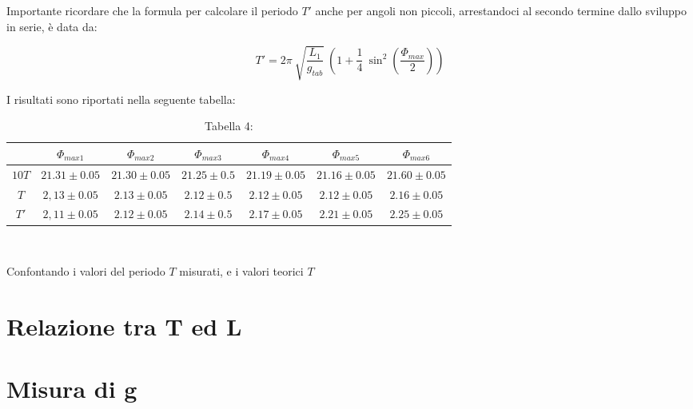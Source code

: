 \documentclass[12pt, a4paper]{article}
\begin{document}
Importante ricordare che la formula per calcolare il periodo $T'$ anche per angoli non piccoli, arrestandoci al secondo termine dallo sviluppo in serie, è data da:

\begin{equation*}
    T'=2\pi\ \sqrt{\frac{L_1}{g_{tab}}}\ \left(1+\frac{1}{4}\ \sin^2{\left(\frac{\Phi_{max}}{2}\right)}\right)
\end{equation*}

\bigskip

I risultati sono riportati nella seguente tabella:

\begin{table}[ht] 
\centering
\begin{tabular}{|c|c|c|c|c|c|c|} 

 \hline
  &$\Phi_{max1}$ & $\Phi_{max2}$ & $\Phi_{max3}$ & $\Phi_{max4}$ & $\Phi_{max5}$ & $\Phi_{max6}$  \\
\hline

  $10T$& $21.31\pm 0.05 $&$21.30\pm0.05$&$21.25\pm0.5$&$21.19\pm0.05$ &$21.16\pm0.05$&$21.60\pm 0.05$\\
\hline
 $T$& $2,13\pm 0.05 $&$2.13\pm0.05$&$2.12\pm0.5$&$2.12\pm0.05$ &$2.12\pm0.05$&$2.16\pm 0.05$\\
\hline
 $T'$& $2,11\pm 0.05 $&$2.12\pm0.05$&$2.14\pm0.5$&$2.17\pm0.05$ &$2.21\pm0.05$&$2.25\pm 0.05$\\
\hline

\end{tabular}\\
\caption*{\centering Tabella 4:\small{\textit{ } }}
    \label{tab T indip Angolo}
\end{table}

\bigskip

Confontando i valori del periodo $T$ misurati, e i valori teorici $T$




\section{Relazione tra T ed L}

\section{Misura di g}
\end{document}
